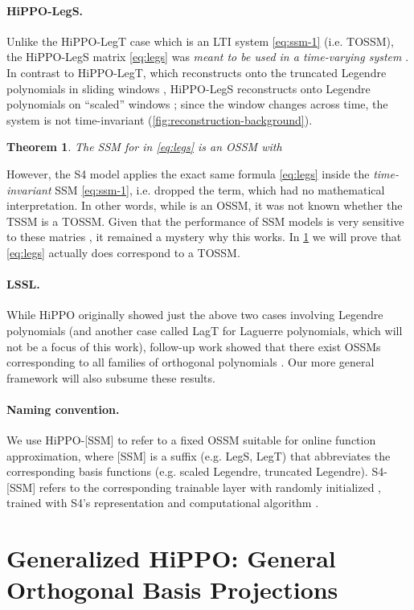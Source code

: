 \documentclass{article}
\newtheorem{theorem}{Theorem}
\newcommand{\para}[1]{\paragraph{#1}}
\begin{document}
\para{HiPPO-LegS.}
Unlike the HiPPO-LegT case which is an LTI system \eqref{eq:ssm-1} (i.e. TOSSM),
the HiPPO-LegS matrix \eqref{eq:legs} was \emph{meant to be used in a time-varying system}  \citep{gu2020hippo}.
In contrast to HiPPO-LegT, which reconstructs onto the truncated Legendre polynomials in sliding windows , HiPPO-LegS reconstructs onto Legendre polynomials on ``scaled'' windows ; since the window changes across time, the system is not time-invariant (\cref{fig:reconstruction-background}).

\begin{theorem}\label{thm:hippo-legs}
  The SSM  for  in \eqref{eq:legs} is an OSSM with
  
\end{theorem}

However, the S4 model applies the exact same formula \eqref{eq:legs} inside the \emph{time-invariant} SSM \eqref{eq:ssm-1}, i.e. dropped the  term, which had no mathematical interpretation.
In other words, while  is an OSSM, it was not known whether the TSSM  is a TOSSM.
Given that the performance of SSM models is very sensitive to these matries  \citep{gu2022efficiently,gupta2022diagonal}, it remained a mystery why this works.
In \cref{sec:hippo} we will prove that \eqref{eq:legs} actually does correspond to a TOSSM.


\para{LSSL.}
While HiPPO originally showed just the above two cases involving Legendre polynomials (and another case called LagT for Laguerre polynomials, which will not be a focus of this work),
follow-up work showed that there exist OSSMs corresponding to all families of orthogonal polynomials .
Our more general framework will also subsume these results.

\para{Naming convention.}
We use HiPPO-[SSM] to refer to a fixed OSSM  suitable for online function approximation, where [SSM] is a suffix (e.g. LegS, LegT) that abbreviates the corresponding basis functions (e.g. scaled Legendre, truncated Legendre).
S4-[SSM] refers to the corresponding trainable layer  with randomly initialized , trained with S4's representation and computational algorithm \citep{gu2022efficiently}.



 
\section{Generalized HiPPO: General Orthogonal Basis Projections}
\label{sec:hippo}
\end{document}
